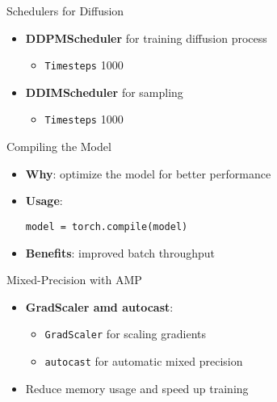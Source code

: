 \begin{frame}{Schedulers for Diffusion}
    \begin{itemize}
        \item \textbf{DDPMScheduler} for training diffusion process
              \begin{itemize}
                  \item \texttt{Timesteps} 1000
              \end{itemize}
        \item \textbf{DDIMScheduler} for sampling
              \begin{itemize}
                  \item \texttt{Timesteps} 1000
              \end{itemize}
    \end{itemize}
\end{frame}

\begin{frame}{Compiling the Model}
    \begin{itemize}
        \item \textbf{Why}: optimize the model for better performance
        \item \textbf{Usage}:
              \begin{semiverbatim}
                  \texttt{model = torch.compile(model)}
              \end{semiverbatim}
        \item \textbf{Benefits}: improved batch throughput
    \end{itemize}
\end{frame}


\begin{frame}{Mixed-Precision with AMP}
    \begin{itemize}
        \item \textbf{GradScaler amd autocast}:
              \begin{itemize}
                  \item \texttt{GradScaler} for scaling gradients
                  \item \texttt{autocast} for automatic mixed precision
              \end{itemize}
        \item Reduce memory usage and speed up training
    \end{itemize}
\end{frame}

